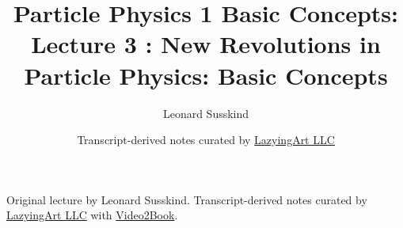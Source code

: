 \documentclass[11pt,oneside]{book}
\begin{document}
\frontmatter
\title{Particle Physics 1 Basic Concepts: Lecture 3 : New Revolutions in Particle Physics: Basic Concepts}
\author{Leonard Susskind}
\date{Transcript-derived notes curated by \href{https://lazying.art}{LazyingArt LLC}}
\maketitle
\begin{center}
\small Original lecture by Leonard Susskind. Transcript-derived notes curated by \href{https://lazying.art}{LazyingArt LLC} with \href{https://github.com/lachlanchen/Video2Book}{Video2Book}.
\end{center}
\clearpage
\mainmatter

\end{document}
